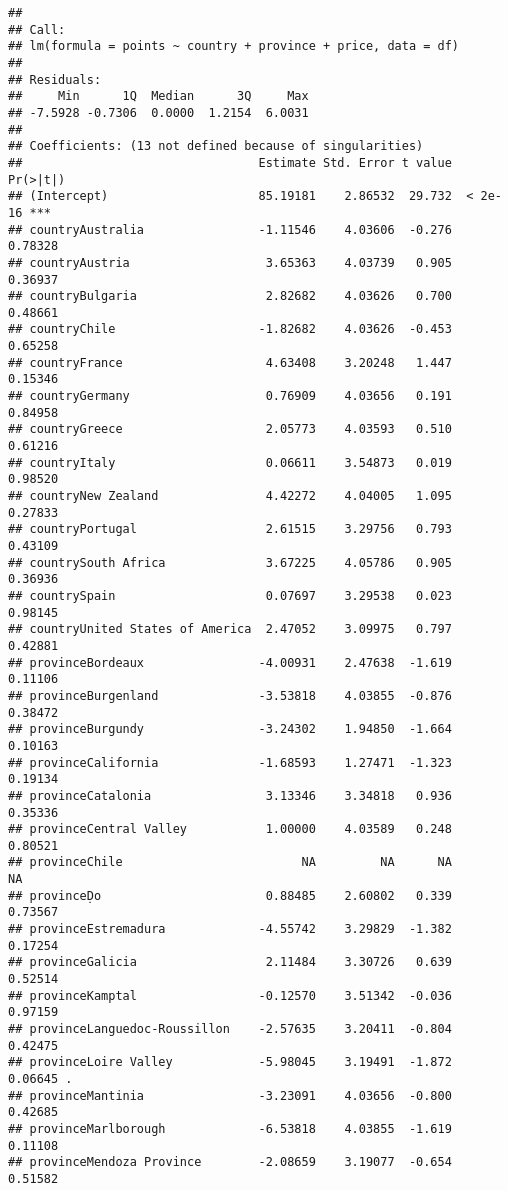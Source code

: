 \documentclass[]{article}
\begin{document}
\begin{verbatim}
## 
## Call:
## lm(formula = points ~ country + province + price, data = df)
## 
## Residuals:
##     Min      1Q  Median      3Q     Max 
## -7.5928 -0.7306  0.0000  1.2154  6.0031 
## 
## Coefficients: (13 not defined because of singularities)
##                                 Estimate Std. Error t value Pr(>|t|)    
## (Intercept)                     85.19181    2.86532  29.732  < 2e-16 ***
## countryAustralia                -1.11546    4.03606  -0.276  0.78328    
## countryAustria                   3.65363    4.03739   0.905  0.36937    
## countryBulgaria                  2.82682    4.03626   0.700  0.48661    
## countryChile                    -1.82682    4.03626  -0.453  0.65258    
## countryFrance                    4.63408    3.20248   1.447  0.15346    
## countryGermany                   0.76909    4.03656   0.191  0.84958    
## countryGreece                    2.05773    4.03593   0.510  0.61216    
## countryItaly                     0.06611    3.54873   0.019  0.98520    
## countryNew Zealand               4.42272    4.04005   1.095  0.27833    
## countryPortugal                  2.61515    3.29756   0.793  0.43109    
## countrySouth Africa              3.67225    4.05786   0.905  0.36936    
## countrySpain                     0.07697    3.29538   0.023  0.98145    
## countryUnited States of America  2.47052    3.09975   0.797  0.42881    
## provinceBordeaux                -4.00931    2.47638  -1.619  0.11106    
## provinceBurgenland              -3.53818    4.03855  -0.876  0.38472    
## provinceBurgundy                -3.24302    1.94850  -1.664  0.10163    
## provinceCalifornia              -1.68593    1.27471  -1.323  0.19134    
## provinceCatalonia                3.13346    3.34818   0.936  0.35336    
## provinceCentral Valley           1.00000    4.03589   0.248  0.80521    
## provinceChile                         NA         NA      NA       NA    
## provinceḌo                       0.88485    2.60802   0.339  0.73567    
## provinceEstremadura             -4.55742    3.29829  -1.382  0.17254    
## provinceGalicia                  2.11484    3.30726   0.639  0.52514    
## provinceKamptal                 -0.12570    3.51342  -0.036  0.97159    
## provinceLanguedoc-Roussillon    -2.57635    3.20411  -0.804  0.42475    
## provinceLoire Valley            -5.98045    3.19491  -1.872  0.06645 .  
## provinceMantinia                -3.23091    4.03656  -0.800  0.42685    
## provinceMarlborough             -6.53818    4.03855  -1.619  0.11108    
## provinceMendoza Province        -2.08659    3.19077  -0.654  0.51582    

\end{verbatim}
\end{document}
